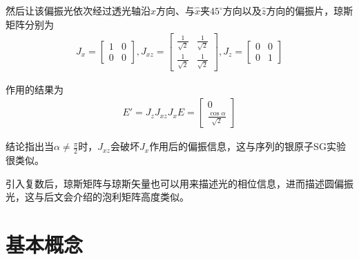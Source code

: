\documentclass[UTF8,12pt]{article}
\newenvironment{ale}{\begin{equation}\nonumber\begin{aligned}}{\end{aligned}\end{equation}}
\numberwithin{equation}{subsection}
\begin{document}
	然后让该偏振光依次经过透光轴沿$\hat x$方向、与$\hat x$夹$45^\circ$方向以及$\hat z$方向的偏振片，琼斯矩阵分别为
	\begin{ale}
		 J_x=\begin{bmatrix}
			1& 0\\
			0& 0
		\end{bmatrix},
		J_{xz}=
		\begin{bmatrix}
			\frac{1}{\sqrt{2}}& \frac{1}{\sqrt{2}}\\
			\frac{1}{\sqrt{2}}& \frac{1}{\sqrt{2}}
		\end{bmatrix},
		J_z=\begin{bmatrix}
			0& 0\\
			0& 1
		\end{bmatrix}
	\end{ale}

	作用的结果为\begin{ale}
		E' = J_zJ_{xz}J_xE=\begin{bmatrix}
			0\\
			\frac{\cos\alpha}{\sqrt{2}}
		\end{bmatrix}
	\end{ale}

	结论指出当$\alpha\not=\frac{\pi}{2}$时，$J_{xz}$会破坏$J_x$作用后的偏振信息，这与序列的银原子SG实验很类似。
	
	引入复数后，琼斯矩阵与琼斯矢量也可以用来描述光的相位信息，进而描述圆偏振光，这与后文会介绍的泡利矩阵高度类似。
	\section{基本概念}
\end{document}
